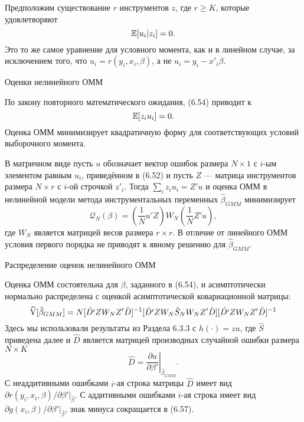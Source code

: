 Предположим существование $r$ инструментов $z$, где $r \ge K$, которые удовлетворяют
\begin{equation}
\mathbb{E}[u_i|z_i]=0.
\end{equation}
Это то же самое уравнение для условного момента, как и в линейном случае, за исключением того, что $u_i=r(y_i,x_i,\beta)$, а не $u_i=y_i-x'_i\beta$.

\begin{center}
Оценки нелинейного ОММ
\end{center}

По закону повторного математического ожидания, (6.54) приводит к
\begin{equation}
\mathbb{E}[z_i u_i]=0.
\end{equation}
Оценка ОММ минимизирует квадратичную форму для соответствующих условий выборочного момента.

В матричном виде пусть $u$ обозначает вектор ошибок размера $N \times 1$ с $i$-ым элементом равным $u_i$, приведённом в (6.52) и пусть $Z$ --- матрица инструментов размера $N \times r$ с $i$-ой строчкой $z'_i$. Тогда $\sum_i z_i u_i =Z'u$ и оценка ОММ в нелинейной модели метода инструментальных переменных $\hat{\beta}_{GMM}$ минимизирует
\begin{equation}
\mathcal{Q}_{N}(\beta)= \left( \frac{1}{N} u'Z \right) W_N \left( \frac{1}{N} Z'u \right),
\end{equation}
где $W_N$ является матрицей весов размера $r \times r$. В отличие от линейного ОММ условия первого порядка не приводят к явному решению для $\hat{\beta}_{GMM}$.

\begin{center}
Распределение оценок нелинейного ОММ
\end{center}

Оценка ОММ состоятельна для $\beta$, заданного в (6.54), и асимптотически нормально распределена с оценкой асимптотической ковариационной матрицы:
\begin{equation}
\widehat{\mathrm{V}}[\hat{\beta}_{GMM}]=N[\hat{D'} Z W_N Z' \hat{D}]^{-1} [\hat{D'} Z W_N \hat{S}_N  W_N Z' \hat{D}] [\hat{D'} Z W_N Z' \hat{D}]^{-1} 
\end{equation}
Здесь мы использовали результаты из Раздела 6.3.3 с $h(\cdot)=zu$, где $\hat{S}$ приведена далее и $\hat{D}$ является матрицей производных случайной ошибки размера $N \times K$ 
\begin{equation}
\hat{D}= \left. \frac{\partial u}{\partial \beta'} \right|_{\hat{\beta}_{GMM}}.
\end{equation}
С неаддитивными ошибками  $i$-ая строка матрицы $\hat{D}$ имеет вид $\partial r(y_i,x_i,\beta)/ \partial \beta'|_{\hat{\beta}}$. С аддитивными ошибками $i$-ая строка имеет вид  $\partial g(x_i,\beta)/ \partial \beta'|_{\hat{\beta}}$, знак минуса сокращается в (6.57).

